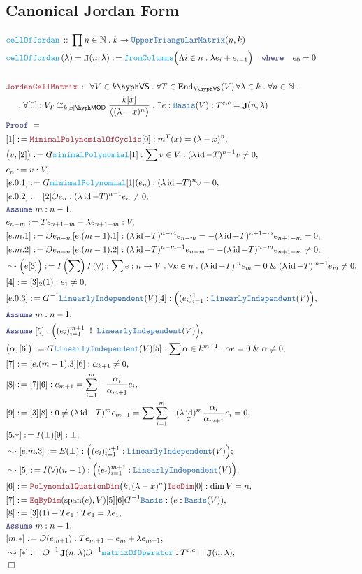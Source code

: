\documentclass[12pt]{scrartcl}%
\newcommand{\TYPE}[1]{\textcolor{NavyBlue}{\mathtt{#1}}}%
\newcommand{\FUNC}[1]{\textcolor{Cerulean}{\mathtt{#1}}}%
\newcommand{\LOGIC}[1]{\textcolor{Blue}{\mathtt{#1}}}%
\newcommand{\THM}[1]{\textcolor{Maroon}{\mathtt{#1}}}%
\renewcommand{\.}{\; . \;} %
\newcommand{\de}{: \kern 0.1pc =} %
\newcommand{\where}{\LOGIC{where}} %
\newcommand{\IsNot}{\; ! \;} %
\newcommand{\Act}[1]{\left( #1 \right)} %
\newcommand{\Theorem}[2]{& \THM{#1} \, :: \, #2 \\ & \Proof = \\ } %
\newcommand{\DeclareFunc}[2]{& \FUNC{#1} \, :: \, #2 \\}%
\newcommand{\DefineNamedFunc}[4]{&  \FUNC{#1}\Act{#2} = #3 \de #4 \\}%
\newcommand{\NewLine}{\\ & \kern 1pc}%
\newcommand{\Page}[1]{ \begin{align*} #1 \end{align*}  }%
\newcommand{ \bd }{ \ByDef }%
\renewcommand{\And}{\; \& \;}%
\newcommand{\Nat}{\mathbb{N}}%
\DeclareMathOperator*{\id}{id}%
\newcommand{\End}{\mathrm{End}}%
\newcommand{\Say}[3]{& #1 \de #2 : #3, \\} %
\newcommand{\Conclude}[3]{& #1 \de #2 : #3; \\}%
\newcommand{\Derive}[3]{& \leadsto #1 \de #2 : #3, \\} %
\newcommand{\DeriveConclude}[3]{& \leadsto #1 \de #2 : #3 ; \\} %
\newcommand{\Assume}[2]{& \LOGIC{Assume} \; #1 : #2, \\} %
\newcommand{\QED}{\; \square} %
\newcommand{\EndProof}{& \QED \\} %
\newcommand{\ByDef}{\rotatebox[origin=c]{-180}{$D$}}%
\newcommand{\ByConstr}{\rotatebox[origin=c]{-180}{$C$}}%
\newcommand{\Proof}{\LOGIC{Proof} \; } %
\newcommand{\Basis}{\TYPE{Basis}} %
\newcommand{\LI}{\TYPE{LinearlyIndependent}}
\newcommand{\UTM}{\TYPE{UpperTriangularMatrix}}
\DeclareMathOperator{\Span}{span} %
\DeclareMathOperator{\JC}{\mathbf{J}}  %
\newcommand{\VS}[1]{#1\hyph\mathsf{VS}} %
\newcommand{\LMOD}[1]{#1\hyph\mathsf{MOD}} %
\begin{document}
\subsection{Canonical Jordan Form}
\Page{
	\DeclareFunc{cellOfJordan}{ \prod n \in \Nat \. k \to \UTM(n,k)}
	\DefineNamedFunc{cellOfJordan}{\lambda}{\JC(n,\lambda)}
	{ \FUNC{fromColumns}\Big( \Lambda i \in n \. \lambda e_i + e_{i-1}  \Big) \quad \where \quad e_0 = 0}
	\\
	\Theorem{JordanCellMatrix}{\forall V \in \VS{k} \. \forall T \in \End_{\VS{k}}(V) \, \forall \lambda \in k \.
		\forall n \in \Nat \. \NewLine \. \forall [0] : V_T \cong_{\LMOD{k[x]}} \frac{k[x]}{\big\langle(\lambda - x)^n\big\rangle} \.
		\exists e : \Basis(V) : T^{e,e} = \JC(n,\lambda)
	}
	\Say{[1]}{\THM{MinimalPolynomialOfCyclic}[0]}{m^T(x) = (\lambda - x)^n}
	\Say{\big(v,[2]\big)}{\bd \FUNC{minimalPolynomial}[1]}{\sum v \in V : (\lambda \id - T)^{n-1}v \neq 0}
	\Say{e_n}{v}{V}
	\Say{[e.0.1]}{\bd \FUNC{minimalPolynomial}[1](e_n)}{(\lambda \id - T)^n v = 0 }
	\Say{[e.0.2]}{[2]\ByConstr e_n}{(\lambda \id - T)^{n-1}e_n \neq 0}
	\Assume{m}{n-1}
	\Say{e_{n-m}}{ Te_{n + 1 - m} - \lambda e_{n + 1 - m}}{V}
	\Say{[e.m.1]}{\ByConstr e_{n-m}[e.(m-1).1]}{(\lambda \id - T)^{n-m}e_{n-m} = -(\lambda \id - T)^{n +1-m}e_{n+1 - m} = 0 }
	\Conclude{[e.m.2]}{\ByConstr e_{n-m}[e.(m-1).2]}{(\lambda \id - T)^{n-m-1}e_{n-m} = -(\lambda \id - T)^{n -m}e_{n+1 - m} \neq 0 }
	\Derive{\Big( e [3]\Big)}{I\Act{\sum}I\Act{\forall}}{\sum e : n \to V \. \forall k \in n \. (\lambda \id - T)^m e_m = 0 \And (\lambda \id - T)^{m-1} e_m \neq 0  }
	\Say{[4]}{[3]_2(1)}{e_1 \neq 0}
	\Say{[e.0.3]}{\bd^{-1}\LI(V)[4]}{\Big( (e_i)_{i=1}^1 : \LI(V) \Big)}
	\Assume{m}{n-1}
	\Assume{[5]}{\Big( (e_i)^{m+1}_{i=1} \; \IsNot \; \LI(V) \Big)}
	\Say{\big(\alpha,[6]\big)}{\bd \LI(V) [5]}{\sum \alpha \in k^{m+1} \. \alpha e = 0 \And \alpha \neq 0 }
	\Say{[7]}{[e.(m-1).3][6]}{ \alpha_{k+1} \neq 0  }
	\Say{[8]}{[7][6]}{e_{m+1} = \sum^m_{i=1} -\frac{\alpha_i}{\alpha_{m+1}} e_i}
	\Say{[9]}{[3][8]}{  0 \neq (\lambda \id - T)^{m}e_{m+1} = \sum  \sum^m_{i+1}-(\lambda \id _ T)^{m} \frac{\alpha_i}{\alpha_{m+1}} e_i = 0  }
	\Conclude{[5.*]}{I(\bot)[9]}{\bot}
	\DeriveConclude{[e.m.3]}{E(\bot)}{\Big((e_i)^{m+1}_{i=1} : \LI(V) \Big)}
	\Derive{[5]}{I(\forall)(n-1)}{\Big((e_i)^{m+1}_{i=1} : \LI(V) \Big)}
	\Say{[6]}{\THM{PolynomialQuatienDim}\big(k,(\lambda - x)^n\big)\THM{IsoDim}[0]}{\dim V = n}
	\Say{[7]}{ \THM{EqByDim}(\Span(e),V )[5][6]\bd^{-1}\TYPE{Basis}}{(e : \TYPE{Basis}(V))}
	\Say{[8]}{[3](1) + Te_1}{Te_1 = \lambda e_1}
	\Assume{m}{n-1}
	\Conclude{[m.*]}{\ByConstr(e_{m+1})}{Te_{m+1} = e_{m} + \lambda e_{m+1}}
	\DeriveConclude{[*]}{\ByConstr^{-1}\JC(n,\lambda)\ByConstr^{-1}\FUNC{matrixOfOperator}}{T^{e,e} = \JC(n,\lambda)}
	\EndProof
}
\end{document}
